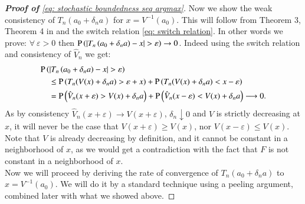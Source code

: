 \begin{proof}[\hypertarget{proof of lemma 3}{\textbf{Proof of}} \eqref{eq: stochastic boundedness seq argmax}]
Now we show the weak consistency of $T_n\left(a_0 + \delta_n a\right)$ for $x=V^{-1}\left(a_0\right)$. This will follow from Theorem 3, Theorem 4 in \cite{1} and the switch relation \eqref{eq: switch relation}. In other words we prove: $\forall \: \varepsilon >0$ then $\mathrm{P}\left(\left|T_n\left(a_0 + \delta_n a \right)-x\right| > \varepsilon  \right) \rightarrow 0$. Indeed using the switch relation and consistency of $\hat{V}_n$ we get:
\begin{align*}
    &\mathrm{P}\left(\left|T_n\left(a_0 + \delta_n a \right)-x\right| > \varepsilon \right) \\
    & \quad \leq \mathrm{P} \left( T_n (V(x) + \delta_n a) > \varepsilon + x \right) + \mathrm{P} \left( T_n (V(x) + \delta_n a) < x - \varepsilon \right) \\
    & \quad = \mathrm{P} \left( \hat{V}_n (x + \varepsilon) > V(x) + \delta_n a \right) + \mathrm{P} \left( \hat{V}_n (x - \varepsilon) < V(x) + \delta_n a \right) \longrightarrow 0.
\end{align*}
As by consistency $\hat{V}_n(x + \varepsilon) \rightarrow V(x+\varepsilon)$, $\delta_n \downarrow 0$ and $V$ is strictly decreasing at $x$, it will never be the case that $V (x + \varepsilon) \geq V(x)$, nor $V (x - \varepsilon) \leq V(x)$. Note that $V$ is already decreasing by definition, and it cannot be constant in a neighborhood of $x$, as we would get a contradiction with the fact that $F$ is not constant in a neighborhood of $x$. \\
Now we will proceed by deriving the rate of convergence of $T_n(a_0 + \delta_n a)$ to $x = V^{-1}(a_0)$. We will do it by a standard technique using a peeling argument, combined later with what we showed above. 


\end{proof}
